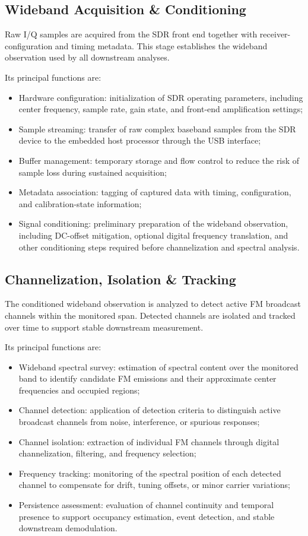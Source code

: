 \documentclass[11pt]{article}
\begin{document}
\subsection*{Wideband Acquisition \& Conditioning}

Raw I/Q samples are acquired from the SDR front end together with receiver-configuration and timing metadata. This stage establishes the wideband observation used by all downstream analyses.

Its principal functions are:
\begin{itemize}
    \item Hardware configuration: initialization of SDR operating parameters, including center frequency, sample rate, gain state, and front-end amplification settings;
    \item Sample streaming: transfer of raw complex baseband samples from the SDR device to the embedded host processor through the USB interface;
    \item Buffer management: temporary storage and flow control to reduce the risk of sample loss during sustained acquisition;
    \item Metadata association: tagging of captured data with timing, configuration, and calibration-state information;
    \item Signal conditioning: preliminary preparation of the wideband observation, including DC-offset mitigation, optional digital frequency translation, and other conditioning steps required before channelization and spectral analysis.
\end{itemize}

\subsection*{Channelization, Isolation \& Tracking}

The conditioned wideband observation is analyzed to detect active FM broadcast channels within the monitored span. Detected channels are isolated and tracked over time to support stable downstream measurement.

Its principal functions are:
\begin{itemize}
    \item Wideband spectral survey: estimation of spectral content over the monitored band to identify candidate FM emissions and their approximate center frequencies and occupied regions;
    \item Channel detection: application of detection criteria to distinguish active broadcast channels from noise, interference, or spurious responses;
    \item Channel isolation: extraction of individual FM channels through digital channelization, filtering, and frequency selection;
    \item Frequency tracking: monitoring of the spectral position of each detected channel to compensate for drift, tuning offsets, or minor carrier variations;
    \item Persistence assessment: evaluation of channel continuity and temporal presence to support occupancy estimation, event detection, and stable downstream demodulation.
\end{itemize}
\end{document}
